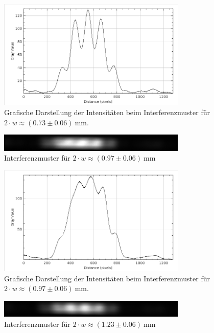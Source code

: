 \documentclass{article}
\begin{document}
\begin{figure}[H]
\centering
\caption{Grafische Darstellung der Intensitäten beim Interferenzmuster für $2\cdot w \approx (0.73\pm0.06)~$mm.}
\includegraphics[width=9cm]{moodle/img4_graph.png}
\end{figure}




\begin{figure}[H]
\centering
\caption{Interferenzmuster für $2\cdot w \approx (0.97\pm0.06)~$mm}
\includegraphics[width=9cm]{moodle/img5.png}
\end{figure}

\begin{figure}[H]
\centering
\caption{Grafische Darstellung der Intensitäten beim Interferenzmuster für $2\cdot w \approx (0.97\pm0.06)~$mm.}
\includegraphics[width=9cm]{moodle/img5_graph.png}
\end{figure}



\begin{figure}[H]
\centering
\caption{Interferenzmuster für $2\cdot w \approx (1.23\pm0.06)~$mm}
\includegraphics[width=9cm]{moodle/img6.png}
\end{figure}
\end{document}
